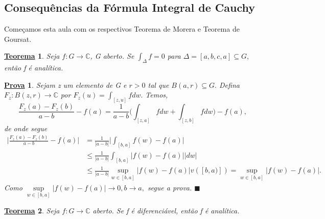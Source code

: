 \documentclass{article}
\newtheorem*{theorem*}{\underline{Teorema}}
\newtheorem*{proof*}{\underline{Prova}}
\renewcommand\qedsymbol{$\blacksquare$}
\begin{document}
  \subsection{Consequ\^encias da F\'ormula Integral de Cauchy}
  Come\c camos esta aula com os respectivos Teorema de Morera e Teorema de Goursat.
  \hypertarget{morera}{\begin{theorem*}
      Seja $f:G\rightarrow \mathbb{C}$, G aberto. Se $\int_{\Delta}^{}f = 0$ para $\Delta = [a, b, c, a]\subseteq{G},$ ent\~ao
      f \'e anal\'itica.
    \end{theorem*}}\begin{proof*}
    Sejam z um elemento de G e $r > 0$ tal que $B(a, r)\subseteq{G}.$ Defina
    $F_{z}:B(z, r)\rightarrow \mathbb{C}$ por $F_{z}(u) = \int_{[z, u]}^{}f dw.$
    Temos,
    $$
    \frac{F_{z}(a) - F_{z}(b)}{a - b} - f(a) = \frac{1}{a-b}\biggl(\int_{[z, a]}^{}fdw + \int_{[z, b]}^{}fdw\biggr) - f(a),
    $$
    de onde segue 
    \begin{align*}
      \biggl|\frac{F_{z}(a) - F_{z}(b)}{a-b} - f(a)\biggr| &= \frac{1}{|a-b|}\biggl|\int_{[b, a]}f(w) - f(a)\biggr| \\
                                                           &\leq \frac{1}{|a-b|}\int_{[b, a]}^{}|f(w) - f(a)||dw| \\
                                                           &\leq \frac{1}{|a-b|}\sup_{w\in[b, a]}|f(w) - f(a)|v([b, a)]) = \sup_{w\in[b, a]}|f(w)-f(a)|.
    \end{align*}
    Como $\sup\limits_{w\in[b, a]}|f(w) - f(a)|\to0, b\to{a},$ segue a prova. \qedsymbol
  \end{proof*}
  \hypertarget{goursat}{\begin{theorem*}
      Seja $f:G\rightarrow \mathbb{C}$ aberto. Se f \'e diferenci\'avel, ent\~ao f \'e anal\'itica.
  \end{theorem*}}
\end{document}
